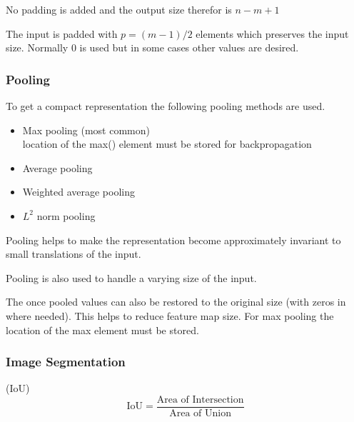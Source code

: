 No padding is added and the output size therefor is $n-m+1$

\newpar{}

The input is padded with $p=(m-1)/2$ elements which preserves the input size. Normally 0 is used but in some cases other values are desired.

\subsubsection{Pooling}
To get a compact representation the following pooling methods are used.
\begin{itemize}
    \item Max pooling (most common)
          \\ location of the max() element must be stored for backpropagation
    \item Average pooling
    \item Weighted average pooling
    \item $L^2$ norm pooling
\end{itemize}

Pooling helps to make the representation become approximately invariant to small translations of the input.

Pooling is also used to handle a varying size of the input.

\newpar{}

The once pooled values can also be restored to the original size (with zeros in where needed). This helps to reduce feature map size. For max pooling the location of the max element must be stored.

\subsubsection{Image Segmentation}

 (IoU)
\begin{equation*}
    \text{IoU} = \frac{\text{Area of Intersection}}{\text{Area of Union}}
\end{equation*}

